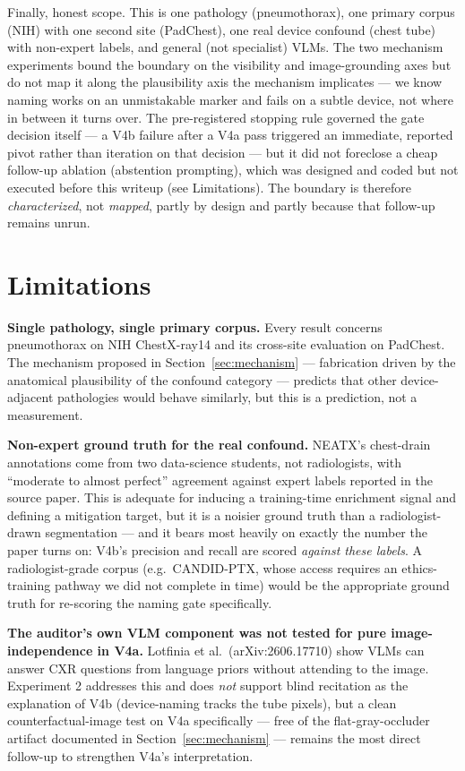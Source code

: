 \documentclass{ieeeaccess}
\begin{document}
Finally, honest scope. This is one pathology (pneumothorax), one primary corpus (NIH) with one second site (PadChest), one real device confound (chest tube) with non-expert labels, and general (not specialist) VLMs. The two mechanism experiments bound the boundary on the visibility and image-grounding axes but do not map it along the plausibility axis the mechanism implicates --- we know naming works on an unmistakable marker and fails on a subtle device, not where in between it turns over. The pre-registered stopping rule governed the gate decision itself --- a V4b failure after a V4a pass triggered an immediate, reported pivot rather than iteration on that decision --- but it did not foreclose a cheap follow-up ablation (abstention prompting), which was designed and coded but not executed before this writeup (see Limitations). The boundary is therefore \emph{characterized}, not \emph{mapped}, partly by design and partly because that follow-up remains unrun.

\section{Limitations}
\label{sec:limitations}
\textbf{Single pathology, single primary corpus.} Every result concerns pneumothorax on NIH ChestX-ray14 and its cross-site evaluation on PadChest. The mechanism proposed in Section~\ref{sec:mechanism} --- fabrication driven by the anatomical plausibility of the confound category --- predicts that other device-adjacent pathologies would behave similarly, but this is a prediction, not a measurement.

\textbf{Non-expert ground truth for the real confound.} NEATX's chest-drain annotations come from two data-science students, not radiologists, with ``moderate to almost perfect'' agreement against expert labels reported in the source paper. This is adequate for inducing a training-time enrichment signal and defining a mitigation target, but it is a noisier ground truth than a radiologist-drawn segmentation --- and it bears most heavily on exactly the number the paper turns on: V4b's precision and recall are scored \emph{against these labels}. A radiologist-grade corpus (e.g.\ CANDID-PTX, whose access requires an ethics-training pathway we did not complete in time) would be the appropriate ground truth for re-scoring the naming gate specifically.

\textbf{The auditor's own VLM component was not tested for pure image-independence in V4a.} Lotfinia et al.\ (arXiv:2606.17710) \cite{lotfinia2026} show VLMs can answer CXR questions from language priors without attending to the image. Experiment 2 addresses this and does \emph{not} support blind recitation as the explanation of V4b (device-naming tracks the tube pixels), but a clean counterfactual-image test on V4a specifically --- free of the flat-gray-occluder artifact documented in Section~\ref{sec:mechanism} --- remains the most direct follow-up to strengthen V4a's interpretation.
\end{document}
